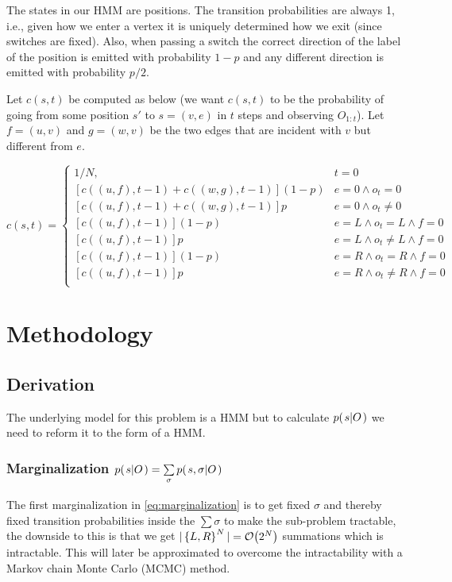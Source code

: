 \documentclass[a4paper,11pt]{kth-mag}
\begin{document}
    The states in our HMM are positions. The transition probabilities are
    always 1, i.e., given how we enter a vertex it is uniquely determined how
    we exit (since switches are fixed). Also, when passing a switch the correct
    direction of the label of the position is emitted with probability $1-p$
    and any different direction is emitted with probability $p/2$.

    Let $c(s,t)$ be computed as below (we want $c(s,t)$ to be the probability
    of going from some position $s'$ to $s=(v,e)$ in $t$ steps and observing
    $O_{1:t}$). Let $f=(u,v)$ and $g=(w,v)$ be the two edges that are incident
    with $v$ but different from $e$.

    \begin{equation}
        c(s,t) =
        \begin{cases}
            1/N, & t = 0 \\
            \left[c((u,f),t-1) + c((w,g),t-1)\right](1-p) & e = 0 \wedge o_t = 0 \\
            \left[c((u,f),t-1) + c((w,g),t-1)\right]p     & e = 0 \wedge o_t \neq 0 \\
            \left[c((u,f),t-1)               \right](1-p) & e = L \wedge o_t = L \wedge f = 0 \\
            \left[c((u,f),t-1)               \right]p     & e = L \wedge o_t \neq L \wedge f = 0 \\
            \left[c((u,f),t-1)               \right](1-p) & e = R \wedge o_t = R \wedge f = 0 \\
            \left[c((u,f),t-1)               \right]p     & e = R \wedge o_t \neq R \wedge f = 0 \\
        \end{cases}
    \end{equation}

    \chapter{Methodology}
        \section{Derivation}
        The underlying model for this problem is a HMM but to calculate $p{(\left. s \middle\vert O \right.)}$ we need to reform it to the form of a HMM.
            \subsection{
                Marginalization 
                $p{(\left. s \middle\vert O \right.)}
                =
                \sum\limits_\sigma p{(\left. s,\sigma \middle\vert O \right.)}
            $}
                The first marginalization in \eqref{eq:marginalization} is 
                to get fixed $\sigma$ and thereby fixed transition 
                probabilities inside the $\sum\limits\sigma$ to make the 
                sub-problem tractable, the downside to this is that we get 
                $|\left\{{L,R}\right\}^N| = \mathcal{O}{\left(2^N\right)}$ summations which is intractable. 
                This will later be approximated to overcome the intractability with a 
                Markov chain Monte Carlo (MCMC) method. 
\end{document}
